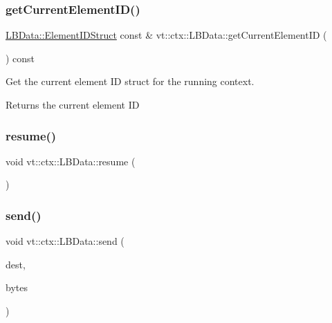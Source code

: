 \subsubsection{\texorpdfstring{get\+Current\+Element\+I\+D()}{getCurrentElementID()}}
{\footnotesize\ttfamily \hyperlink{structvt_1_1ctx_1_1_l_b_data_aad9fac05c3faf80173b273d900db6fb1}{L\+B\+Data\+::\+Element\+I\+D\+Struct} const  \& vt\+::ctx\+::\+L\+B\+Data\+::get\+Current\+Element\+ID (\begin{DoxyParamCaption}{ }\end{DoxyParamCaption}) const}



Get the current element ID struct for the running context. 

\begin{DoxyReturn}{Returns}
the current element ID 
\end{DoxyReturn}
\mbox{\label{structvt_1_1ctx_1_1_l_b_data_a378b75f6f9e5dd48866d8020436b03fe}} 
\subsubsection{\texorpdfstring{resume()}{resume()}}
{\footnotesize\ttfamily void vt\+::ctx\+::\+L\+B\+Data\+::resume (\begin{DoxyParamCaption}{ }\end{DoxyParamCaption})}

\mbox{\label{structvt_1_1ctx_1_1_l_b_data_a9db5527f7fa49548e4a856ea1caff73a}} 
\subsubsection{\texorpdfstring{send()}{send()}}
{\footnotesize\ttfamily void vt\+::ctx\+::\+L\+B\+Data\+::send (\begin{DoxyParamCaption}\item[{\hyperlink{structvt_1_1elm_1_1_element_i_d_struct}{elm\+::\+Element\+I\+D\+Struct}}]{dest,  }\item[{\hyperlink{namespacevt_a408e86a8c7c89309b52907dc5a513924}{Msg\+Size\+Type}}]{bytes }\end{DoxyParamCaption})}



